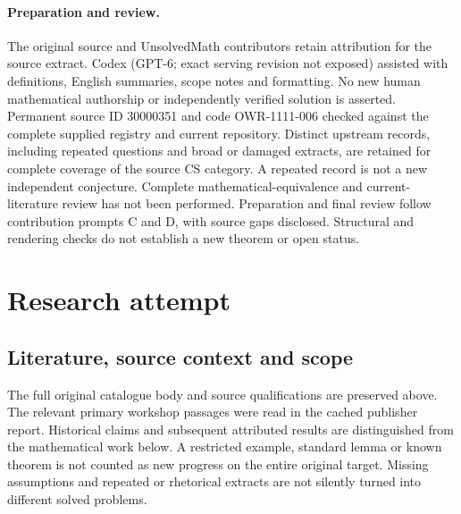 \documentclass[11pt]{article}
\begin{document}
\paragraph{Preparation and review.}
The original source and UnsolvedMath contributors retain attribution for the source extract. Codex (GPT-6; exact serving revision not exposed) assisted with definitions, English summaries, scope notes and formatting. No new human mathematical authorship or independently verified solution is asserted. Permanent source ID 30000351 and code OWR-1111-006 checked against the complete supplied registry and current repository. Distinct upstream records, including repeated questions and broad or damaged extracts, are retained for complete coverage of the source CS category. A repeated record is not a new independent conjecture. Complete mathematical-equivalence and current-literature review has not been performed. Preparation and final review follow contribution prompts C and D, with source gaps disclosed. Structural and rendering checks do not establish a new theorem or open status.
\label{end:30000351}

\section{Research attempt}
\subsection{Literature, source context and scope}
The full original catalogue body and source qualifications are preserved above. The relevant primary workshop passages were read in the cached publisher report. Historical claims and subsequent attributed results are distinguished from the mathematical work below. A restricted example, standard lemma or known theorem is not counted as new progress on the entire original target. Missing assumptions and repeated or rhetorical extracts are not silently turned into different solved problems.
\end{document}
